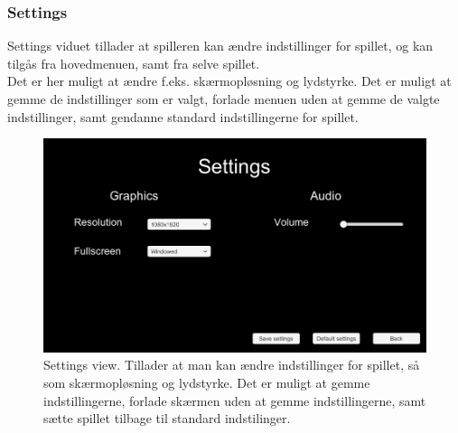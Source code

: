\subsubsection{Settings}
Settings viduet tillader at spilleren kan ændre indstillinger for spillet, og kan tilgås fra hovedmenuen, samt fra selve spillet.\\
Det er her muligt at ændre f.eks. skærmopløsning og lydstyrke. Det er muligt at gemme de indstillinger som er valgt, forlade menuen uden at gemme de valgte indstillinger, samt gendanne standard indstillingerne for spillet. 

\begin{figure}[H]
\centering
\includegraphics[width = \textwidth]{02-Body/Images/settingsMockup.PNG}
\caption{Settings view. Tillader at man kan ændre indstillinger for spillet, så som skærmopløsning og lydstyrke. Det er muligt at gemme indstillingerne, forlade skærmen uden at gemme indstillingerne, samt sætte spillet tilbage til standard indstilinger.}
\label{fig:Design-FE-mockup-settings}
\end{figure}

\newpage
